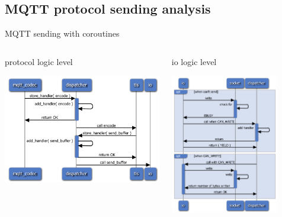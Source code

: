 \documentclass{beamer}
\begin{document}
\subsection{ MQTT protocol sending analysis }

\begin{frame}{ MQTT sending with coroutines }
   \begin{columns}
      \begin{column}{0.5\textwidth}
         \begin{block}{protocol logic level}
            \centerline{\includegraphics[width=1.0\textwidth]{slides/mqtt_coroutines.pdf}}
         \end{block}
      \end{column}
      \begin{column}{0.5\textwidth}
         \begin{block}{io logic level}
            \centerline{\includegraphics[width=0.8\textwidth]{slides/coroutines_write.pdf}}
         \end{block}
      \end{column}
   \end{columns}
\end{frame}
\end{document}
